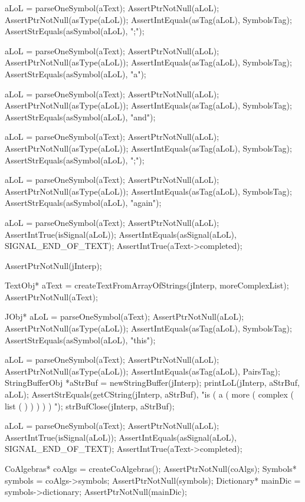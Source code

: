   aLoL = parseOneSymbol(aText);
  AssertPtrNotNull(aLoL);
  AssertPtrNotNull(asType(aLoL));
  AssertIntEquals(asTag(aLoL), SymbolsTag);
  AssertStrEquals(asSymbol(aLoL), ";");

  aLoL = parseOneSymbol(aText);
  AssertPtrNotNull(aLoL);
  AssertPtrNotNull(asType(aLoL));
  AssertIntEquals(asTag(aLoL), SymbolsTag);
  AssertStrEquals(asSymbol(aLoL), "a");

  aLoL = parseOneSymbol(aText);
  AssertPtrNotNull(aLoL);
  AssertPtrNotNull(asType(aLoL));
  AssertIntEquals(asTag(aLoL), SymbolsTag);
  AssertStrEquals(asSymbol(aLoL), "and");

  aLoL = parseOneSymbol(aText);
  AssertPtrNotNull(aLoL);
  AssertPtrNotNull(asType(aLoL));
  AssertIntEquals(asTag(aLoL), SymbolsTag);
  AssertStrEquals(asSymbol(aLoL), ";");

  aLoL = parseOneSymbol(aText);
  AssertPtrNotNull(aLoL);
  AssertPtrNotNull(asType(aLoL));
  AssertIntEquals(asTag(aLoL), SymbolsTag);
  AssertStrEquals(asSymbol(aLoL), "again");

  aLoL = parseOneSymbol(aText);
  AssertPtrNotNull(aLoL);
  AssertIntTrue(isSignal(aLoL));
  AssertIntEquals(asSignal(aLoL), SIGNAL_END_OF_TEXT);
  AssertIntTrue(aText->completed);
\stopCTest
\stopTestCase

\startCTest
  AssertPtrNotNull(jInterp);

  TextObj* aText = createTextFromArrayOfStrings(jInterp, moreComplexList);
  AssertPtrNotNull(aText);

  JObj* aLoL = parseOneSymbol(aText);
  AssertPtrNotNull(aLoL);
  AssertPtrNotNull(asType(aLoL));
  AssertIntEquals(asTag(aLoL), SymbolsTag);
  AssertStrEquals(asSymbol(aLoL), "this");

  aLoL = parseOneSymbol(aText);
  AssertPtrNotNull(aLoL);
  AssertPtrNotNull(asType(aLoL));
  AssertIntEquals(asTag(aLoL), PairsTag);
  StringBufferObj *aStrBuf = newStringBuffer(jInterp);
  printLoL(jInterp, aStrBuf, aLoL);
  AssertStrEquals(getCString(jInterp, aStrBuf),
    "is ( a ( more ( complex ( list ( ) ) ) ) ) ");
  strBufClose(jInterp, aStrBuf);

  aLoL = parseOneSymbol(aText);
  AssertPtrNotNull(aLoL);
  AssertIntTrue(isSignal(aLoL));
  AssertIntEquals(asSignal(aLoL), SIGNAL_END_OF_TEXT);
  AssertIntTrue(aText->completed);
\stopCTest
\stopTestCase

\startCTest
  CoAlgebras* coAlgs = createCoAlgebras();
  AssertPtrNotNull(coAlgs);
  Symbols* symbols = coAlgs->symbols;
  AssertPtrNotNull(symbols);
  Dictionary* mainDic = symbols->dictionary;
  AssertPtrNotNull(mainDic);

